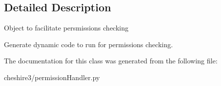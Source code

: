 \subsection{Detailed Description}
\begin{DoxyVerb}Object to facilitate persmissions checking

Generate dynamic code to run for permissions checking.
\end{DoxyVerb}
 

The documentation for this class was generated from the following file\-:\begin{DoxyCompactItemize}
\item 
cheshire3/permission\-Handler.\-py\end{DoxyCompactItemize}
